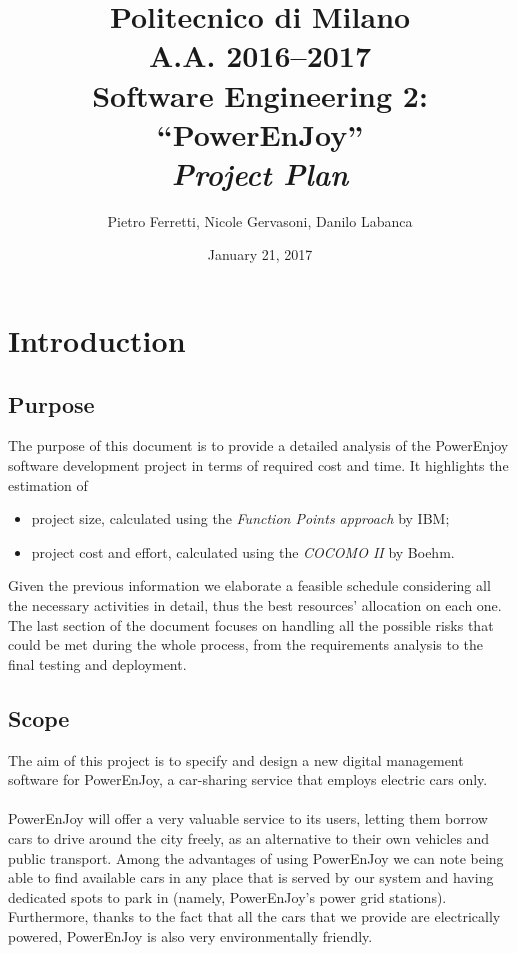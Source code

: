 \documentclass[english]{article}
\begin{document}
\title{Politecnico di Milano\\
 A.A. 2016–2017 \\
Software Engineering 2: “PowerEnJoy” \\
\emph{\textbf{Project Plan}}}

\author{Pietro Ferretti, Nicole Gervasoni, Danilo Labanca}
\date{January 21, 2017}
\maketitle

\newpage

\tableofcontents{}

\newpage

\section{Introduction}

\subsection{Purpose}
The purpose of this document is to provide a detailed analysis of the PowerEnjoy software development project in terms of required cost and time. It highlights the estimation of 
\begin{itemize}
\item project size, calculated using the \emph{Function Points approach} by IBM;
\item project cost and effort, calculated using the \emph{COCOMO II} by Boehm.
\end{itemize}
Given the previous information we elaborate a feasible schedule considering all the necessary activities in detail, thus the best resources' allocation on each one. The last section of the document focuses on handling all the possible risks that could be met during the whole process, from the requirements analysis to the final testing and deployment.


\subsection{Scope}
The aim of this project is to specify and design a new digital management software for PowerEnJoy, a car-sharing service that employs electric cars only.

\paragraph{}
PowerEnJoy will offer a very valuable service to its users, letting them borrow cars to drive around the city freely, as an alternative to their own vehicles and public transport.
Among the advantages of using PowerEnJoy we can note being able to find available cars in any place that is served by our system and having dedicated spots to park in (namely, PowerEnJoy's power grid stations).
Furthermore, thanks to the fact that all the cars that we provide are electrically powered, PowerEnJoy is also very environmentally friendly.
\end{document}

